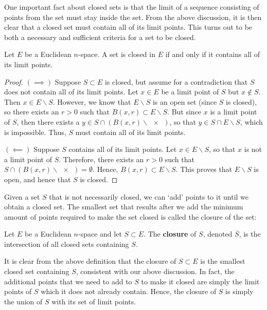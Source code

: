 \vspace{3mm}

One important fact about closed sets is that the limit of a sequence consisting of points from the set must stay inside the set. From the above discussion, it is then clear that a closed set must contain all of its limit points. This turns out to be both a necessary and sufficient criteria for a set to be closed.

\begin{proposition}
  Let \( E \) be a Euclidean \( n \)-space. A set is closed in \( E \) if and only if it contains all of its limit points.
\end{proposition}
\begin{proof}
  \( (\implies) \) Suppose \( S\subset E \) is closed, but assume for a contradiction that \( S \) does not contain all of its limit points. Let \( x\in E \) be a limit point of \( S \) but \( x\notin S \). Then \( x\in E\backslash S \). However, we know that \( E\backslash S \) is an open set (since \( S \) is closed), so there exists an \( r>0 \) such that \( B(x,r)\subset E\backslash S \). But since \( x \) is a limit point of \( S \), then there exists a \( y\in  S\cap (B(x,r)\backslash\qty{x}) \), so that \( y\in S\cap E\backslash S \), which is impossible. Thus, \( S \) must contain all of its limit points.

  \vspace{3mm}

  \( (\impliedby) \) Suppose \( S \) contains all of its limit points. Let \( x\in E\backslash S \), so that \( x \) is not a limit point of \( S \). Therefore, there exists an \( r>0 \) such that \( S\cap (B(x,r)\backslash\qty{x})=\emptyset \). Hence, \( B(x,r)\subset E\backslash S \). This proves that \( E\backslash S \) is open, and hence that \( S \) is closed.
\end{proof}

Given a set \( S \) that is not necessarily closed, we can `add' points to it until we obtain a closed set. The smallest set that results after we add the minimum amount of points required to make the set closed is called the closure of the set:

\begin{definition}
  Let \( E \) be a Euclidean \( n \)-space and let \( S\subset E \). The \textbf{closure} of \( S \), denoted \( \overline{S} \), is the intersection of all closed sets containing \( S \).
\end{definition}

It is clear from the above definition that the closure of \( S\subset E \) is the smallest closed set containing \( S \), consistent with our above discussion. In fact, the additional points that we need to add to \( S \) to make it closed are simply the limit points of \( S \) which it does not already contain. Hence, the closure of \( S \) is simply the union of \( S \) with its set of limit points.

